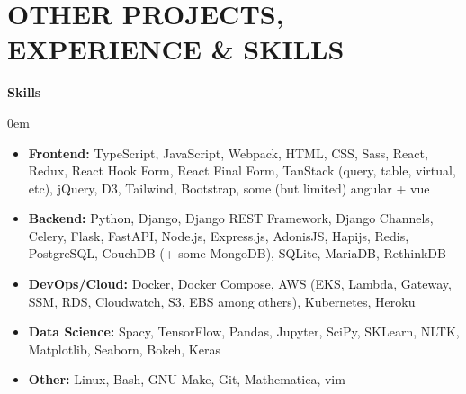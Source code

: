 \documentclass[11pt]{resume}
\begin{document}
      \vspace{-2em}
    \noindent\begin{minipage}[t]{1\textwidth}
      {\section* {\large{OTHER PROJECTS, EXPERIENCE \& SKILLS}}}
      \large{\bf Skills}
      \vspace{.5em}
      \begin{addmargin}[.5em]{0em}
        \begin{itemize}
            \setlength\itemsep{.1em}

            \item {{\bf Frontend:} TypeScript, JavaScript, Webpack, HTML, CSS,
              Sass, React, Redux, React Hook Form, React Final Form, TanStack
              (query, table, virtual, etc), jQuery, D3, Tailwind, Bootstrap,
              some (but limited) angular + vue}

            \item {{\bf Backend:} Python, Django, Django REST Framework, Django
              Channels, Celery, Flask, FastAPI, Node.js, Express.js, AdonisJS,
              Hapijs, Redis, PostgreSQL, CouchDB (+ some MongoDB), SQLite, MariaDB,
              RethinkDB}

            \item {{\bf DevOps/Cloud:} Docker, Docker Compose, AWS (EKS,
              Lambda, Gateway, SSM, RDS, Cloudwatch, S3, EBS among others),
              Kubernetes, Heroku}

            \item {{\bf Data Science:} Spacy, TensorFlow, Pandas, Jupyter,
              SciPy, SKLearn, NLTK, Matplotlib, Seaborn, Bokeh, Keras}

            \item {{\bf Other:} Linux, Bash, GNU Make, Git, Mathematica, vim}

        \end{itemize}
      \end{addmargin}

      \vspace{.5em}


\end{minipage}
\end{document}
